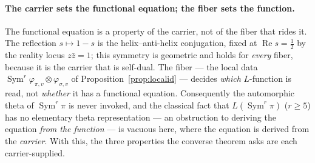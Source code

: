 \documentclass[11pt]{article}
\theoremstyle{definition}
\renewcommand{\Re}{\operatorname{Re}}
\newcommand{\Sym}{\operatorname{Sym}}
\begin{document}
\paragraph{The carrier sets the functional equation; the fiber sets the function.} The functional
equation is a property of the carrier, not of the fiber that rides it. The reflection $s\mapsto1-s$ is
the helix--anti-helix conjugation, fixed at $\Re s=\tfrac12$ by the reality locus $z\bar z=1$; this
symmetry is geometric and holds for \emph{every} fiber, because it is the carrier that is self-dual. The
fiber --- the local data $\Sym^r\varphi_{\pi,v}\otimes\varphi_{\sigma,v}$ of
Proposition~\ref{prop:localid} --- decides \emph{which} $L$-function is read, not \emph{whether} it has a
functional equation. Consequently the automorphic theta of $\Sym^r\pi$ is never invoked, and the
classical fact that $L(\Sym^r\pi)$ ($r\ge5$) has no elementary theta representation --- an obstruction to
deriving the equation \emph{from the function} --- is vacuous here, where the equation is derived from
the \emph{carrier}. With this, the three properties the converse theorem asks are each carrier-supplied.
\end{document}
